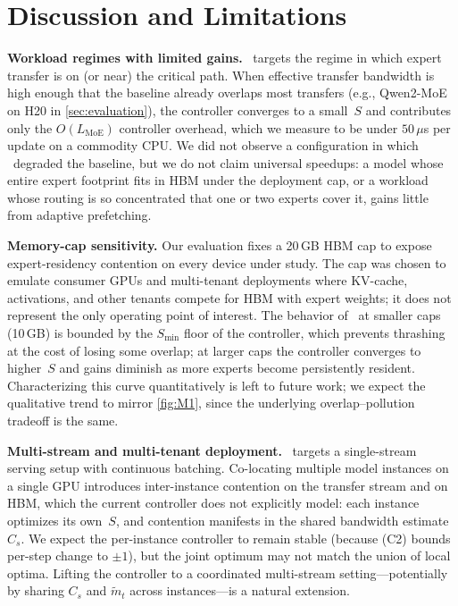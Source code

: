 \section{Discussion and Limitations}
\label{sec:discussion}

\textbf{Workload regimes with limited gains.}
\systemname\ targets the regime in which expert transfer is on (or
near) the critical path. When effective transfer bandwidth is high
enough that the baseline already overlaps most transfers (e.g.,
Qwen2-MoE on H20 in \autoref{sec:evaluation}), the controller
converges to a small~$S$ and contributes only the
$O(L_{\text{MoE}})$ controller overhead, which we measure to be
under $50\,\mu$s per update on a commodity CPU. We did not observe a
configuration in which \systemname\ degraded the baseline, but we do
not claim universal speedups: a model whose entire expert footprint
fits in HBM under the deployment cap, or a workload whose routing is
so concentrated that one or two experts cover it, gains little from
adaptive prefetching.

\textbf{Memory-cap sensitivity.}
Our evaluation fixes a 20\,GB HBM cap to expose expert-residency
contention on every device under study. The cap was chosen to
emulate consumer GPUs and multi-tenant deployments where KV-cache,
activations, and other tenants compete for HBM with expert weights;
it does not represent the only operating point of interest. The
behavior of \systemname\ at smaller caps (10\,GB) is bounded by the
$S_{\min}$ floor of the controller, which prevents thrashing at the
cost of losing some overlap; at larger caps the controller converges
to higher~$S$ and gains diminish as more experts become persistently
resident. Characterizing this curve quantitatively is left to future
work; we expect the qualitative trend to mirror
\autoref{fig:M1}, since the underlying overlap--pollution tradeoff
is the same.

\textbf{Multi-stream and multi-tenant deployment.}
\systemname\ targets a single-stream serving setup with continuous
batching. Co-locating multiple model instances on a single GPU
introduces inter-instance contention on the transfer stream and on
HBM, which the current controller does not explicitly model: each
instance optimizes its own~$S$, and contention manifests in the
shared bandwidth estimate~$C_s$. We expect the per-instance
controller to remain stable (because (C2) bounds per-step change to
$\pm1$), but the joint optimum may not match the union of local
optima. Lifting the controller to a coordinated multi-stream
setting---potentially by sharing $C_s$ and $\tilde{m}_t$ across
instances---is a natural extension.

